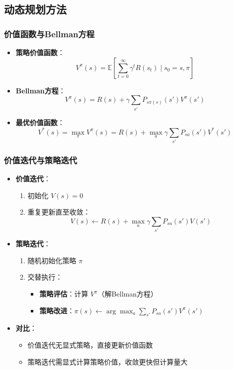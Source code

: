 \subsection{动态规划方法}
\subsubsection{价值函数与Bellman方程}
\begin{itemize}
    \item \textbf{策略价值函数}：
        \[
        V^\pi(s) = \mathbb{E}\left[ \sum_{t=0}^\infty \gamma^t R(s_t) \mid s_0=s, \pi \right]
        \]
    \item \textbf{Bellman方程}：
        \[
        V^\pi(s) = R(s) + \gamma \sum_{s'} P_{s\pi(s)}(s') V^\pi(s')
        \]
    \item \textbf{最优价值函数}：
        \[
        V^*(s) = \max_\pi V^\pi(s) = R(s) + \max_a \gamma \sum_{s'} P_{sa}(s') V^*(s')
        \]
\end{itemize}

\subsubsection{价值迭代与策略迭代}
\begin{itemize}
    \item \textbf{价值迭代}：
        \begin{enumerate}
            \item 初始化 \(V(s) = 0\)
            \item 重复更新直至收敛：
                \[
                V(s) \leftarrow R(s) + \max_a \gamma \sum_{s'} P_{sa}(s') V(s')
                \]
        \end{enumerate}
    \item \textbf{策略迭代}：
        \begin{enumerate}
            \item 随机初始化策略 \(\pi\)
            \item 交替执行：
                \begin{itemize}
                    \item \textbf{策略评估}：计算 \(V^\pi\)（解Bellman方程）
                    \item \textbf{策略改进}：\(\pi(s) \leftarrow \arg\max_a \sum_{s'} P_{sa}(s') V^\pi(s')\)
                \end{itemize}
        \end{enumerate}
    \item \textbf{对比}：
        \begin{itemize}
            \item 价值迭代无显式策略，直接更新价值函数
            \item 策略迭代需显式计算策略价值，收敛更快但计算量大
        \end{itemize}
\end{itemize}


